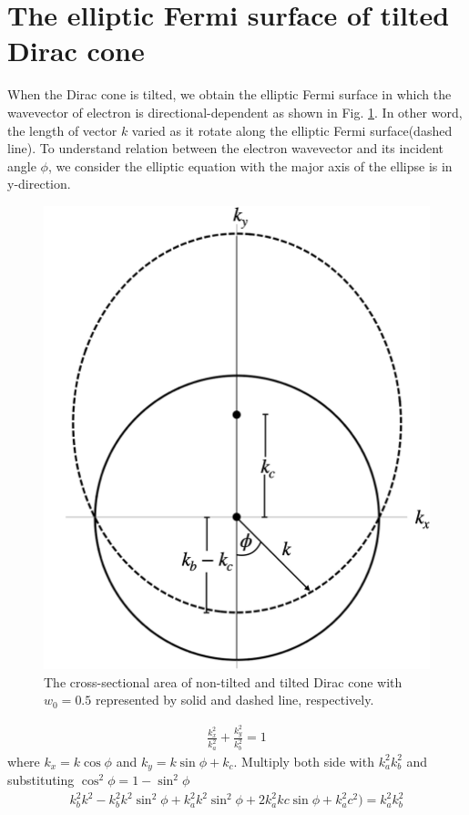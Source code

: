 \section{The elliptic Fermi surface of tilted Dirac cone} \label{sec:elliptic fermi surface}
    When the Dirac cone is tilted, we obtain the elliptic Fermi surface in which the wavevector of electron is directional-dependent as shown in Fig. \ref{fig:elliptic fermi surface}.
    In other word, the length of vector $k$ varied as it rotate along the elliptic Fermi surface(dashed line).
    To understand relation between the electron wavevector and its incident angle $\phi$, we consider the elliptic equation with the major axis of the ellipse is in y-direction.
    \begin{figure}[H]
        \centering
        \includegraphics[width = 0.6\linewidth]{fig/elliptic fermi surface.png}
        \caption{The cross-sectional area of non-tilted and tilted Dirac cone with $w_0 = 0.5$ represented by solid and dashed line, respectively.}
        \label{fig:elliptic fermi surface}
    \end{figure}
    \begin{align} \label{eq:elliptic eq}
        \frac{k_x^2}{k_a^2} + \frac{k_y^2}{k_b^2} = 1
    \end{align}
    where $k_x = k\cos{\phi}$ and $k_y = k\sin{\phi} + k_c$. Multiply both side with $k_a^2 k_b^2$ and substituting $\cos^2{\phi} = 1 - \sin^2{\phi}$
    \begin{equation}
        \begin{aligned}
            k_b^2 k^2 -k_b^2 k^2 \sin^2{\phi} + k_a^2k^2 \sin^2{\phi}+2 k_a^2 k c \sin{\phi} +k_a^2 c^2)=k_a^2 k_b^2
        \end{aligned}
    \end{equation}
